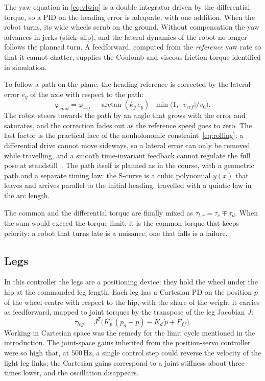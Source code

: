 \documentclass[11pt,a4paper]{article}
\newcommand{\tc}{\tau_c}
\newcommand{\td}{\tau_d}
\begin{document}
The yaw equation in \eqref{eq:vlwip} is a double integrator driven by the differential torque, so a PID on the
heading error is adequate, with one addition. When the robot turns, its wide wheels scrub on the ground. Without
compensation the yaw advances in jerks (stick--slip), and the lateral dynamics of the robot no longer follows the
planned turn. A feedforward, computed from the \emph{reference} yaw rate so that it cannot chatter, supplies the
Coulomb and viscous friction torque identified in simulation.

To follow a path on the plane, the heading reference is corrected by the lateral error $e_y$ of the axle with
respect to the path:
\begin{equation}
  \varphi_{cmd}=\varphi_{ref}-\arctan(k_y\,e_y)\cdot\min\!\big(1,\ |v_{ref}|/v_0\big).
  \label{eq:guidance}
\end{equation}
The robot steers towards the path by an angle that grows with the error and saturates, and the correction fades
out as the reference speed goes to zero. The last factor is the practical face of the nonholonomic
constraint~\eqref{eq:rolling}: a differential drive cannot move sideways, so a lateral error can only be removed
while travelling, and a smooth time-invariant feedback cannot regulate the full pose at
standstill~\cite{brockett1983}. The path itself is planned as in the course, with a geometric path and a separate
timing law: the S-curve is a cubic polynomial $y(x)$ that leaves and arrives parallel to the initial heading,
travelled with a quintic law in the arc length.

The common and the differential torque are finally mixed as $\tau_{l,r}=\tc\mp\td$. When the sum would exceed the
torque limit, it is the common torque that keeps priority: a robot that turns late is a nuisance, one that falls
is a failure.

\subsection{Legs}

In this controller the legs are a positioning device: they hold the wheel under the hip at the commanded leg
length. Each leg has a Cartesian PD on the position $p$ of the wheel centre with respect to the hip, with the
share of the weight it carries as feedforward, mapped to joint torques by the transpose of the leg Jacobian $J$:
\begin{equation}
  \tau_{leg}=J^{T}\big(K_p\,(p_d-p)-K_d\,\dot p+F_{ff}\big).
  \label{eq:legs}
\end{equation}
Working in Cartesian space was the remedy for the limit cycle mentioned in the introduction. The joint-space gains
inherited from the position-servo controller were so high that, at 500\,Hz, a single control step could reverse the
velocity of the light leg links; the Cartesian gains correspond to a joint stiffness about three times lower, and
the oscillation disappears.
\end{document}
